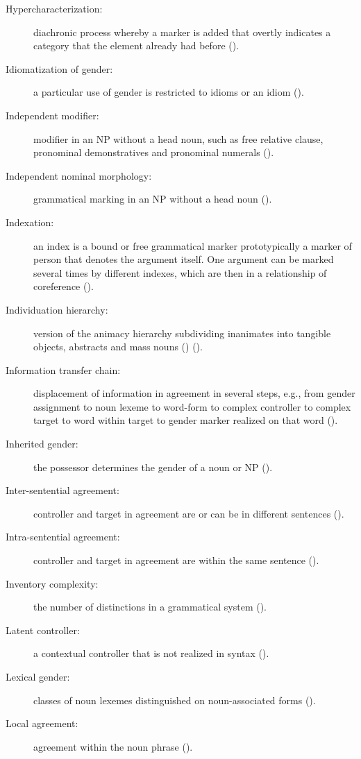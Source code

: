 \documentclass[output=collectionpaper]{langsci/langscibook}
\begin{document}
{\begin{description}
\item  [Hypercharacterization:] diachronic process whereby a marker is added that overtly indicates a category that the element already had before ().
\item  [Idiomatization of gender:] a particular use of gender is restricted to idioms or an idiom ().
\item  [Independent modifier:] modifier in an NP without a head noun, such as free relative clause, pronominal demonstratives and pronominal numerals ().
\item  [Independent nominal morphology:] grammatical marking in an NP without a head noun ().
\item  [Indexation:] an index is a bound or free grammatical marker \textendash{} prototypically a marker of person \textendash{} that denotes the argument itself. One argument can be marked several times by different indexes, which are then in a relationship of coreference ().
\item  [Individuation hierarchy:] version of the animacy hierarchy subdividing inanimates into tangible objects, abstracts and mass nouns (\citealt{Sasse1993}) ().
\item  [Information transfer chain:] displacement of information in agreement in several steps, e.g., from gender assignment to noun lexeme to word-form to complex controller to complex target to word within target to gender marker realized on that word ().
\item  [Inherited gender:] the possessor determines the gender of a noun or NP ().
\item  [Inter-sentential agreement:] controller and target in agreement are or can be in different sentences ().
\item  [Intra-sentential agreement:] controller and target in agreement are within the same sentence ().
\item  [Inventory complexity:] the number of distinctions in a grammatical system ().
\item  [Latent controller:] a contextual controller that is not realized in syntax ().
\item  [Lexical gender:] classes of noun lexemes distinguished on noun-associated forms ().
\item  [Local agreement:] agreement within the noun phrase ().

\end{description}}
\end{document}
